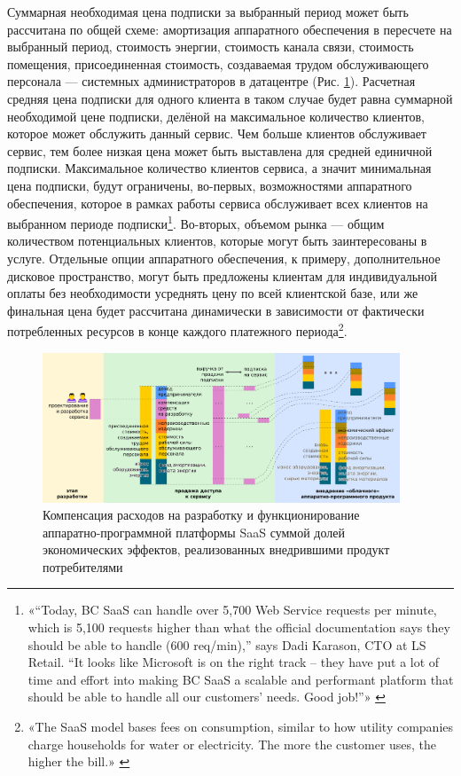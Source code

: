 \documentclass{article}
\begin{document}
Суммарная необходимая цена подписки за выбранный период может быть рассчитана по общей схеме: амортизация аппаратного обеспечения в пересчете на выбранный период, стоимость энергии, стоимость канала связи, стоимость помещения, присоединенная стоимость, создаваемая трудом обслуживающего персонала — системных администраторов в датацентре (Рис. \ref{fig:model_eco_effect_saas}). Расчетная средняя цена подписки для одного клиента в таком случае будет равна суммарной необходимой цене подписки, делёной на максимальное количество клиентов, которое может обслужить данный сервис. Чем больше клиентов обслуживает сервис, тем более низкая цена может быть выставлена для средней единичной подписки. Максимальное количество клиентов сервиса, а значит минимальная цена подписки, будут ограничены, во-первых, возможностями аппаратного обеспечения, которое в рамках работы сервиса обслуживает всех клиентов на выбранном периоде подписки\footnote{«“Today, BC SaaS can handle over 5,700 Web Service requests per minute, which is 5,100 requests higher than what the official documentation says they should be able to handle (600 req/min),” says Dadi Karason, CTO at LS Retail. “It looks like Microsoft is on the right track – they have put a lot of time and effort into making BC SaaS a scalable and performant platform that should be able to handle all our customers’ needs. Good job!”» \cite{erpSaas}}. Во-вторых, объемом рынка — общим количеством потенциальных клиентов, которые могут быть заинтересованы в услуге. Отдельные опции аппаратного обеспечения, к примеру, дополнительное дисковое пространство, могут быть предложены клиентам для индивидуальной оплаты без необходимости усреднять цену по всей клиентской базе, или же финальная цена будет рассчитана динамически в зависимости от фактически потребленных ресурсов в конце каждого платежного периода\footnote{«The SaaS model bases fees on consumption, similar to how utility companies charge households for water or electricity. The more the customer uses, the higher the bill.» \cite{sellingServices}}.

\begin{figure}[h]
    \centering
    \includegraphics[width=0.95\textwidth]{model-eco-effect-saas}
    \caption{Компенсация расходов на разработку и функционирование аппаратно-программной платформы SaaS суммой долей экономических эффектов, реализованных внедрившими продукт потребителями}
    \label{fig:model_eco_effect_saas}
\end{figure}
\end{document}
